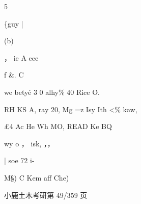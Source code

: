 \documentclass[UTF8,12pt,a4paper,openany]{ctexbook}
\begin{document}
\begin{enumerate}[label=\textbf{\arabic*.},leftmargin=2em]
          5\par \{guy                     |\par (b)\par ，  ie A      eee\par f \&.       C\par we betyé 3 0 alhy\% 40 Rice O.\par RH KS A, ray 20, Mg =z Isy Ith <\% kaw,\par £4 Ac He Wh MO, READ Ke BQ\par wy           o ，                  isk, ，，\par | soe          72 i-\par M§) C Kem                                aff Che)\par 小鹿土木考研第 49/359 页         
\end{enumerate}
\end{document}
